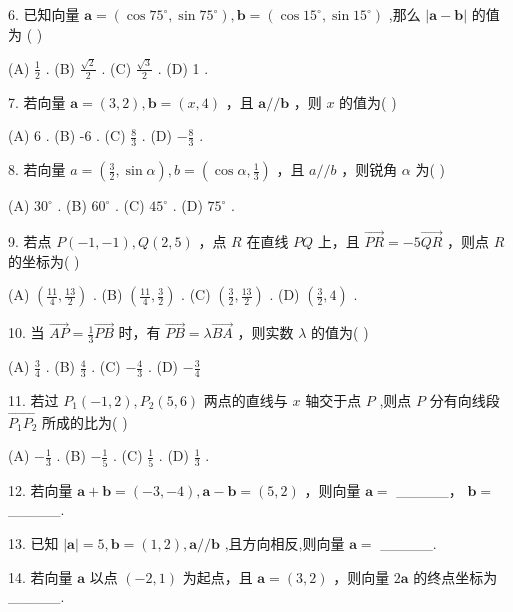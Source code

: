 \documentclass[10pt]{article}
\begin{document}
6. 已知向量 \(\mathbf{a} = \left( {\cos {75}^{ \circ  },\sin {75}^{ \circ  }}\right) ,\mathbf{b} = \left( {\cos {15}^{ \circ  },\sin {15}^{ \circ  }}\right)\) ,那么 \(\left| {\mathbf{a} - \mathbf{b}}\right|\) 的值为 ( )

(A) \(\frac{1}{2}\) . (B) \(\frac{\sqrt{2}}{2}\) . (C) \(\frac{\sqrt{3}}{2}\) . (D) 1 .

7. 若向量 \(\mathbf{a} = \left( {3,2}\right) ,\mathbf{b} = \left( {x,4}\right)\) ，且 \(\mathbf{a}//\mathbf{b}\) ，则 \(x\) 的值为( )

(A) 6 . (B) -6 . (C) \(\frac{8}{3}\) . (D) \(- \frac{8}{3}\) .

8. 若向量 \(a = \left( {\frac{3}{2},\sin \alpha }\right) ,b = \left( {\cos \alpha ,\frac{1}{3}}\right)\) ，且 \(a//b\) ，则锐角 \(\alpha\) 为( )

(A) \({30}^{ \circ  }\) . (B) \({60}^{ \circ  }\) . (C) \({45}^{ \circ  }\) . (D) \({75}^{ \circ  }\) .

9. 若点 \(P\left( {-1, - 1}\right) ,Q\left( {2,5}\right)\) ，点 \(R\) 在直线 \({PQ}\) 上，且 \(\overrightarrow{PR} =  - 5\overrightarrow{QR}\) ，则点 \(R\) 的坐标为( )

(A) \(\left( {\frac{11}{4},\frac{13}{2}}\right)\) . (B) \(\left( {\frac{11}{4},\frac{3}{2}}\right)\) . (C) \(\left( {\frac{3}{2},\frac{13}{2}}\right)\) . (D) \(\left( {\frac{3}{2},4}\right)\) .

10. 当 \(\overrightarrow{AP} = \frac{1}{3}\overrightarrow{PB}\) 时，有 \(\overrightarrow{PB} = \lambda \overrightarrow{BA}\) ，则实数 \(\lambda\) 的值为( )

(A) \(\frac{3}{4}\) . (B) \(\frac{4}{3}\) . (C) \(- \frac{4}{3}\) . (D) \(- \frac{3}{4}\)

11. 若过 \({P}_{1}\left( {-1,2}\right) ,{P}_{2}\left( {5,6}\right)\) 两点的直线与 \(x\) 轴交于点 \(P\) ,则点 \(P\) 分有向线段 \(\overrightarrow{{P}_{1}{P}_{2}}\) 所成的比为( )

(A) \(- \frac{1}{3}\) . (B) \(- \frac{1}{5}\) . (C) \(\frac{1}{5}\) . (D) \(\frac{1}{3}\) .

12. 若向量 \(\mathbf{a} + \mathbf{b} = \left( {-3, - 4}\right) ,\mathbf{a} - \mathbf{b} = \left( {5,2}\right)\) ，则向量 \(\mathbf{a} =\) \_\_\_\_\_， \(\mathbf{b} =\) \_\_\_\_\_.

13. 已知 \(\left| \mathbf{a}\right|  = 5,\mathbf{b} = \left( {1,2}\right) ,\mathbf{a}//\mathbf{b}\) ,且方向相反,则向量 \(\mathbf{a} =\) \_\_\_\_\_.

14. 若向量 \(\mathbf{a}\) 以点 \(\left( {-2,1}\right)\) 为起点，且 \(\mathbf{a} = \left( {3,2}\right)\) ，则向量 \(2\mathbf{a}\) 的终点坐标为\_\_\_\_\_.
\end{document}
